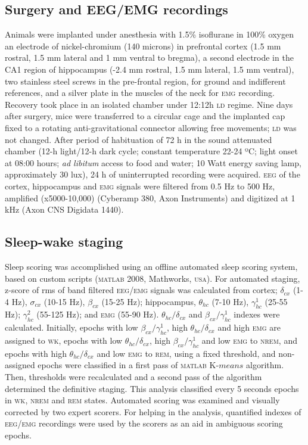 \documentclass[10pt,letterpaper]{article}
\def\EMG/{\textsc{emg}}
\def\EEG/{\textsc{eeg}}
\def\REM/{\textsc{rem}}
\def\NREM/{\textsc{nrem}}
\def\WK/{\textsc{wk}}
\def\LD/{\textsc{ld}}
\def\EEG/{\textsc{eeg}}
\def\EMG/{\textsc{emg}}
\begin{document}
\subsection{Surgery and EEG/EMG recordings}
Animals were implanted under anesthesia with 1.5\% isoflurane in 100\% oxygen an electrode of nickel-chromium (140 microns) in prefrontal cortex (1.5 mm rostral, 1.5 mm lateral and 1 mm ventral to bregma), a second electrode in the CA1 region of hippocampus (-2.4 mm rostral, 1.5 mm lateral, 1.5 mm ventral), two stainless steel screws in the pre-frontal region, for ground and indifferent references, and a silver plate in the muscles of the neck for \EMG/ recording. Recovery took place in an isolated chamber under 12:12h \LD/ regime. Nine days after surgery, mice were transferred to a circular  cage and the implanted cap fixed to a rotating anti-gravitational connector allowing free movements; \LD/ was not changed. After period of habituation of 72 h in the sound attenuated chamber (12-h light/12-h dark cycle; constant temperature 22-24 ºC; light onset at 08:00 hours; \emph{ad libitum} access to food and water; 10 Watt  energy saving lamp, approximately 30 lux), 24 h of uninterrupted recording were acquired.  \EEG/ of the cortex, hippocampus and \EMG/ signals were filtered from 0.5 Hz to 500 Hz, amplified (x5000-10,000) (Cyberamp 380, Axon Instruments) and digitized at 1 kHz (Axon CNS Digidata 1440).

\subsection{Sleep-wake staging}

Sleep scoring was accomplished using an offline automated sleep scoring system, based on  custom scripts (\textsc{matlab} 2008, Mathworks, \textsc{usa}). For automated staging,  z-score of rms of band filtered  \EEG//\EMG/ signals was calculated from  cortex; $\delta_{cx}$ (1-4 Hz),  $\sigma_{cx}$ (10-15 Hz), $\beta_{cx}$ (15-25 Hz); hippocampus, $\theta_{hc}$  (7-10 Hz),  $\gamma_{hc}^{1}$ (25-55 Hz); $\gamma_{hc}^{2} $ (55-125 Hz); and \EMG/  (55-90 Hz).  $\theta_{hc}/ \delta_{cx}$ and $\beta_{cx}/ \gamma_{hc}^{1}$ indexes were calculated.   Initially, epochs with low  $\beta_{cx}/ \gamma_{hc}^{1}$,  high $\theta_{hc}/ \delta_{cx}$ and high \EMG/ are assigned to \WK/, epochs with low $\theta_{hc}/ \delta_{cx}$,  high $\beta_{cx}/ \gamma_{hc}^{1}$ and low \EMG/ to \NREM/, and epochs with high $\theta_{hc}/ \delta_{cx}$  and low \textsc{\EMG/} to \REM/, using a fixed  threshold, and non-assigned epochs were classified in a first pass of \textsc{matlab}  K-$means$ algorithm. Then, thresholds were recalculated and  a second pass of the algorithm determined the definitive staging.  This analysis classified every 5 seconds epochs in \WK/, \NREM/ and \REM/ states. Automated scoring was examined and visually corrected  by two expert scorers. For helping in the analysis, quantified indexes of \EEG//\EMG/ recordings were  used by the scorers as an aid in ambiguous scoring epochs. 
\end{document}
